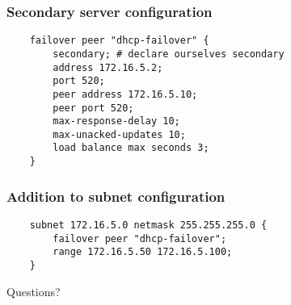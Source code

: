 \documentclass[10pt]{beamer}
\begin{document}
\begin{frame}[fragile]
	\frametitle{Secondary server configuration}
	\begin{verbatim}
	failover peer "dhcp-failover" {
	    secondary; # declare ourselves secondary
	    address 172.16.5.2;
	    port 520;
  	    peer address 172.16.5.10;
	    peer port 520;
	    max-response-delay 10;
	    max-unacked-updates 10;
	    load balance max seconds 3;
	}
	\end{verbatim}

\end{frame}

\begin{frame}[fragile]
	\frametitle{Addition to subnet configuration}
	\begin{verbatim}
	subnet 172.16.5.0 netmask 255.255.255.0 {
	    failover peer "dhcp-failover";
	    range 172.16.5.50 172.16.5.100;
	}
	\end{verbatim}

\end{frame}
\begin{frame}
	Questions?
\end{frame}
\end{document}
